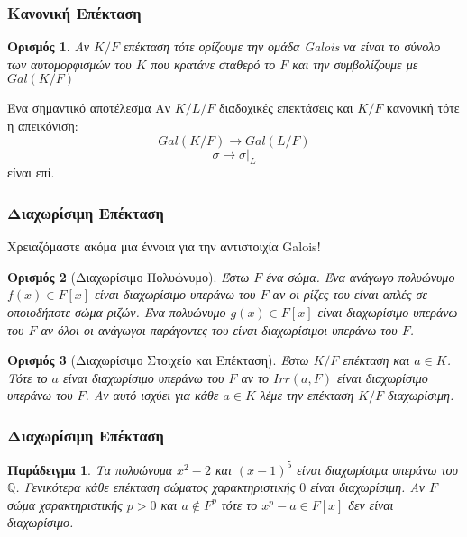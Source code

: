 \documentclass{beamer}
\newcommand {\tl}{\textlatin}
\newtheorem{exa}{Παράδειγμα}
\newtheorem*{defn}{Ορισμός}
\begin{document}
\begin{frame}
    \frametitle{Κανονική Επέκταση}
    \begin{defn}
    Αν $K/F$ επέκταση τότε ορίζουμε την ομάδα \tl{Galois} να είναι το σύνολο των αυτομορφισμών του $K$ που κρατάνε σταθερό το $F$ και την συμβολίζουμε με $Gal(K/F)$
    \end{defn}
    \begin{block}{Ένα σημαντικό αποτέλεσμα}
        Αν $K/L/F$ διαδοχικές επεκτάσεις και $K/F$ κανονική τότε η απεικόνιση:
        $$Gal(K/F) \longrightarrow Gal(L/F)$$
        $$ \sigma \longmapsto \sigma|_L$$
        είναι επί. %
    \end{block}
\end{frame}
\begin{frame}
    \frametitle{Διαχωρίσιμη Επέκταση}
    Χρειαζόμαστε ακόμα μια έννοια για την αντιστοιχία \tl{Galois}!
    \begin{defn}[Διαχωρίσιμο Πολυώνυμο]
    	Έστω $F$ ένα σώμα. Ένα ανάγωγο πολυώνυμο $f(x) \in F[x]$ είναι διαχωρίσιμο υπεράνω του $F$ αν οι ρίζες του είναι απλές σε οποιοδήποτε σώμα ριζών. Ένα πολυώνυμο $g(x) \in F[x]$ είναι διαχωρίσιμο υπεράνω του $F$ αν όλοι οι ανάγωγοι παράγοντες του είναι διαχωρίσιμοι υπεράνω του $F$.
    \end{defn}
    \pause
    \begin{defn}[Διαχωρίσιμο Στοιχείο και Επέκταση]
	Έστω $K/F$ επέκταση και $a \in K$. Τότε το $a$ είναι διαχωρίσιμο υπεράνω του $F$ αν το $Irr(a,F)$ είναι διαχωρίσιμο υπεράνω του $F$. Αν αυτό ισχύει για κάθε $a \in K$ λέμε την επέκταση $K/F$ διαχωρίσιμη.
    \end{defn}
\end{frame}
\begin{frame}
    \frametitle{Διαχωρίσιμη Επέκταση}
    \begin{exa}
    Τα πολυώνυμα $x^2 - 2$ και $(x-1)^5$ είναι διαχωρίσιμα υπεράνω του $\mathbb{Q}$. Γενικότερα κάθε επέκταση σώματος χαρακτηριστικής $0$ είναι διαχωρίσιμη. Αν $F$ σώμα χαρακτηριστικής $p>0$ και $a \not\in F^p$ τότε το $x^p - a \in F[x]$ δεν είναι διαχωρίσιμο.
    \end{exa}
\end{frame}
\end{document}
